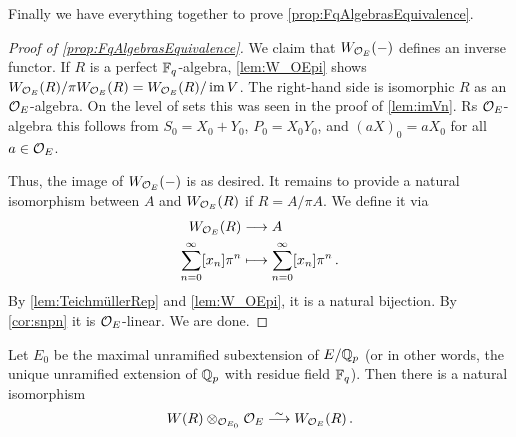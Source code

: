 Finally we have everything together to prove \cref{prop:FqAlgebrasEquivalence}.
\begin{proof}[Proof of \cref{prop:FqAlgebrasEquivalence}]
	We claim that $W_{\mathcal{O}_E}(-)$ defines an inverse functor. If $R$ is a perfect $\mathbb{F}_q$-algebra, \cref{lem:W_OEpi} shows $W_{\mathcal{O}_E}(R)/\pi W_{\mathcal{O}_E}(R)= W_{\mathcal{O}_E}(R)/\operatorname{im} V$. The right-hand side is isomorphic $R$ as an $\mathcal{O}_E$-algebra. On the level of sets this was seen in the proof of \cref{lem:imVn}. Rs $\mathcal{O}_E$-algebra this follows from $S_0=X_0+Y_0$, $P_0=X_0Y_0$, and $(aX)_0=aX_0$ for all $a\in\mathcal{O}_E$.
	
	Thus, the image of $W_{\mathcal{O}_E}(-)$ is as desired. It remains to provide a natural isomorphism between $A$ and $W_{\mathcal{O}_E}(R)$ if $R=A/\pi A$. We define it via
	\begin{align*}
		W_{\Oo_E}(R)&\morphism A\\
		\sum_{n=0}^\infty[x_n]\pi^n&\longmapsto\sum_{n=0}^\infty[x_n]\pi^n\,.
	\end{align*}
	By \cref{lem:TeichmüllerRep} and \cref{lem:W_OEpi}, it is a natural bijection. By \cref{cor:snpn} it is $\mathcal{O}_E$-linear. We are done.
\end{proof}
\begin{cor}\label{cor:unramifiedWitt}
	Let $E_0$ be the maximal unramified subextension of $E/\mathbb{Q}_p$ (or in other words, the unique unramified extension of $\mathbb{Q}_p$ with residue field $\mathbb{F}_q$). Then there is a natural isomorphism
	\begin{equation*}
		W(R)\otimes_{\Oo_{E_0}}\Oo_E\isomorphism W_{\Oo_E}(R)\,.
	\end{equation*}
\end{cor}
